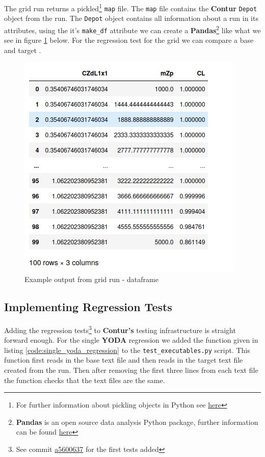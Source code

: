 The grid run returns a pickled\footnote{For further information about pickling objects in Python see \href{https://docs.python.org/3/library/pickle.html}{here}} \texttt{map} file. The \texttt{map} file contains the \textbf{Contur} \texttt{Depot} object from the run. The \texttt{Depot} object contains all information about a run in its attributes, using the it's \texttt{make\_df} attribute we can create a \textbf{Pandas}\footnote{\textbf{Pandas} is an open source data analysis Python package, further information can be found \href{https://pandas.pydata.org}{here} }  like what we see in figure \ref{fig:contur_df_output} below. For the regression test for the grid we can compare a base and target .

\begin{figure}[H]
\centering
\includegraphics[scale=0.6]{plots/example_data_frame.png}
\caption{Example output from grid run - dataframe}
\label{fig:contur_df_output}
\end{figure}


\subsection{Implementing Regression Tests}
Adding the regression tests\footnote{See commit \href{https://gitlab.com/hepcedar/contur/-/commit/a56006379872ee45c6b7689ce3aeea8ab8fd7435}{a5600637} for the first tests added} to \textbf{Contur's} testing infrastructure is straight forward enough. For the single \textbf{YODA} regression we added the function given in listing \ref{code:single_yoda_regression} to the \texttt{test\_executables.py} script. This function first reads in the base text file and then reads in the target text file created from the run. Then after removing the first three lines from each text file the function checks that the text files are the same.

